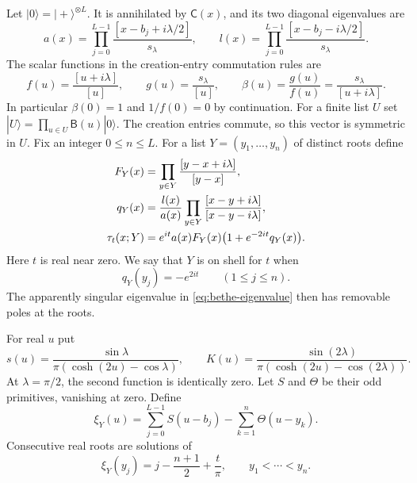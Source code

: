 Let $|0\rangle=|+\rangle^{\otimes L}$.  It is annihilated by
$\mathsf C(x)$, and its two diagonal eigenvalues are
\begin{equation}\label{eq:vacuum-functions}
 a(x)=\prod_{j=0}^{L-1}\frac{[x-b_j+i\lambda/2]}{s_\lambda},
 \qquad
 l(x)=\prod_{j=0}^{L-1}\frac{[x-b_j-i\lambda/2]}{s_\lambda}.
\end{equation}
The scalar functions in the creation-entry commutation rules are
\begin{equation}\label{eq:fgbeta}
 f(u)=\frac{[u+i\lambda]}{[u]},\qquad
 g(u)=\frac{s_\lambda}{[u]},\qquad
 \beta(u)=\frac{g(u)}{f(u)}=\frac{s_\lambda}{[u+i\lambda]}.
\end{equation}
In particular $\beta(0)=1$ and $1/f(0)=0$ by continuation.
For a finite list $U$ set
$|U\rangle=\prod_{u\in U}\mathsf B(u)|0\rangle$.
The creation entries commute, so this vector is symmetric in $U$.
Fix an integer $0\le n\le L$.  For a list
$Y=(y_1,\ldots,y_n)$ of distinct roots define
\begin{align}
 F_Y(x)&=\prod_{y\in Y}\frac{[y-x+i\lambda]}{[y-x]},\notag\\
 q_Y(x)&=\frac{l(x)}{a(x)}
          \prod_{y\in Y}\frac{[x-y+i\lambda]}{[x-y-i\lambda]},
 \label{eq:bethe-functions}\\
 \tau_t(x;Y)&=e^{it}a(x)F_Y(x)
                   \bigl(1+e^{-2it}q_Y(x)\bigr).
 \label{eq:bethe-eigenvalue}
\end{align}
Here $t$ is real near zero.  We say that $Y$ is on shell for $t$ when
\begin{equation}\label{eq:bethe-equations}
 q_Y(y_j)=-e^{2it}\qquad(1\le j\le n).
\end{equation}
The apparently singular eigenvalue in \eqref{eq:bethe-eigenvalue} then
has removable poles at the roots.

For real $u$ put
\begin{equation}\label{eq:bare-kernels}
 s(u)=\frac{\sin\lambda}{\pi(\cosh(2u)-\cos\lambda)},\qquad
 K(u)=\frac{\sin(2\lambda)}
               {\pi(\cosh(2u)-\cos(2\lambda))}.
\end{equation}
At $\lambda=\pi/2$, the second function is identically zero.  Let $S$
and $\Theta$ be their odd primitives, vanishing at zero.  Define
\begin{equation}\label{eq:counting-function}
 \xi_Y(u)=\sum_{j=0}^{L-1}S(u-b_j)-\sum_{k=1}^n\Theta(u-y_k).
\end{equation}
Consecutive real roots are solutions of
\begin{equation}\label{eq:consecutive-counting}
 \xi_Y(y_j)=j-\frac{n+1}{2}+\frac t\pi,
 \qquad y_1<\cdots<y_n.
\end{equation}

